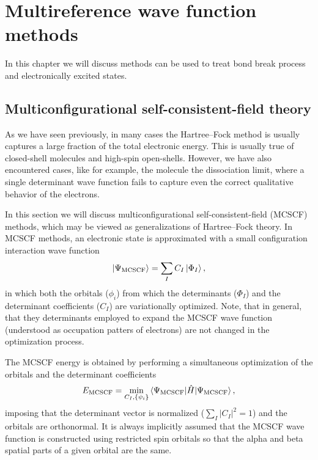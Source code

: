 \documentclass[../Main/chem532-notes.tex]{subfiles}
\begin{document}
\setcounter{chapter}{9}

\chapter{Multireference wave function methods}
In this chapter we will discuss methods can be used to treat bond break process and electronically excited states.

\section{Multiconfigurational self-consistent-field theory}

As we have seen previously, in many cases the Hartree--Fock method is usually captures a large fraction of the total electronic energy.
This is usually true of closed-shell molecules and high-spin open-shells.
However, we have also encountered cases, like for example, the  molecule the dissociation limit, where a single determinant wave function fails to capture even the correct qualitative behavior of the electrons.

In this section we will discuss multiconfigurational self-consistent-field (MCSCF) methods, which may be viewed as generalizations of Hartree--Fock theory.
In MCSCF methods, an electronic state is approximated with a small configuration interaction wave function
\begin{equation}
\ket{\Psi_\mathrm{MCSCF}} 
= \sum_I C_I \ket{\Phi_I},
\end{equation}
 in which both the orbitals ($\phi_i$) from which the determinants ($\Phi_I$) and the determinant coefficients ($C_I$) are variationally optimized.
Note, that in general, that they determinants employed to expand the MCSCF wave function (understood as occupation patters of electrons) are not changed in the optimization process.
 
The MCSCF energy is obtained by performing a simultaneous optimization of the orbitals and the determinant coefficients
\begin{equation}
E_\mathrm{MCSCF} = \min_{C_I, \{ \psi_i \}}\braket{\Psi_\mathrm{MCSCF} | \hat{H} | \Psi_\mathrm{MCSCF}},
\end{equation}
imposing that the determinant vector is normalized ($\sum_I |C_I|^2 = 1$) and the orbitals are orthonormal.
It is always implicitly assumed that the MCSCF wave function is constructed using restricted spin orbitals so that the alpha and beta spatial parts of a given orbital are the same.
\end{document}
